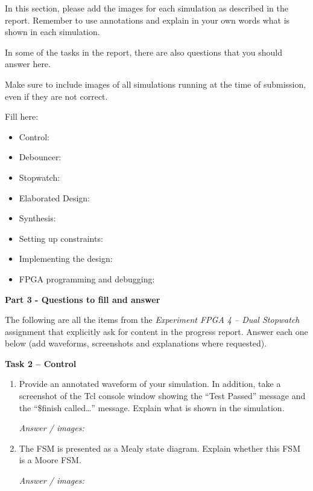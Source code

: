 \documentclass[11pt,a4paper]{article}
\newcommand{\answerspace}[1]{%
  \par\vspace{1mm}\noindent\textit{Answer / images:}\par\vspace{#1}%
}
\begin{document}
\vspace{0.5em}
In this section, please add the images for each simulation as described in the report. Remember to use annotations and explain in your own words what is shown in each simulation.

In some of the tasks in the report, there are also questions that you should answer here.

Make sure to include images of all simulations running at the time of submission, even if they are not correct.

\vspace{0.5em}
Fill here:
\begin{itemize}[topsep=2pt]
  \item Control:
  \item Debouncer:
  \item Stopwatch:
  \item Elaborated Design:
  \item Synthesis:
  \item Setting up constraints:
  \item Implementing the design:
  \item FPGA programming and debugging:
\end{itemize}

\clearpage

{\fontsize{14}{17}\selectfont \textbf{Part 3 - Questions to fill and answer}}

\vspace{0.3em}
The following are all the items from the \emph{Experiment FPGA 4 -- Dual Stopwatch} assignment that explicitly ask for content in the progress report. Answer each one below (add waveforms, screenshots and explanations where requested).

\vspace{0.8em}
\textbf{Task 2 -- Control}
\begin{enumerate}[label=(\roman*),leftmargin=2.2em,topsep=2pt]
  \item Provide an annotated waveform of your simulation. In addition, take a screenshot of the Tcl console window showing the ``Test Passed'' message and the ``\$finish called\ldots'' message. Explain what is shown in the simulation.
  \answerspace{3.5cm}
  \item The FSM is presented as a Mealy state diagram. Explain whether this FSM is a Moore FSM.
  \answerspace{3cm}
\end{enumerate}
\end{document}
